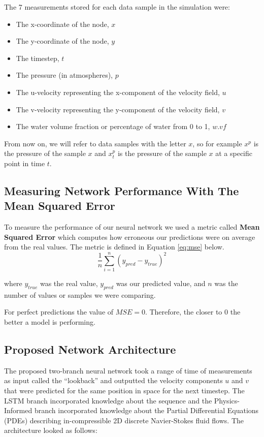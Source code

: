 The 7 measurements stored for each data sample in the simulation were:
\begin{itemize}
    \item The x-coordinate of the node, $x$
    \item The y-coordinate of the node, $y$
    \item The timestep, $t$
    \item The pressure (in atmospheres), $p$
    \item The u-velocity representing the x-component of the velocity field, $u$
    \item The v-velocity representing the y-component of the velocity field, $v$
    \item The water volume fraction or percentage of water from 0 to 1, $w.vf$
\end{itemize}

From now on, we will refer to data samples with the letter $x$, so for example $x^p$ is the pressure of the sample $x$ and $x_t^p$ is the pressure of the sample $x$ at a specific point in time $t$.

\subsection{Measuring Network Performance With The Mean Squared Error}
To measure the performance of our neural network we used a metric called \textbf{Mean Squared Error} which computes how erroneous our predictions were on average from the real values. The metric is defined in Equation \ref{eq:mse} below.
\begin{equation} \label{eq:mse}
    \frac{1}{n} \sum_{i=1}^{n}(y_{pred}-y_{true})^2
\end{equation}

where $y_{true}$ was the real value, $y_{pred}$ was our predicted value, and $n$ was the number of values or samples we were comparing.

For perfect predictions the value of $MSE = 0$. Therefore, the closer to 0 the better a model is performing.

\subsection{Proposed Network Architecture}
The proposed two-branch neural network took a range of time of measurements as input called the ``lookback'' and outputted the velocity components $u$ and $v$ that were predicted for the same position in space for the next timestep. The LSTM branch incorporated knowledge about the sequence and the Physics-Informed branch incorporated knowledge about the Partial Differential Equations (PDEs) describing in-compressible 2D discrete Navier-Stokes fluid flows. The architecture looked as follows:

